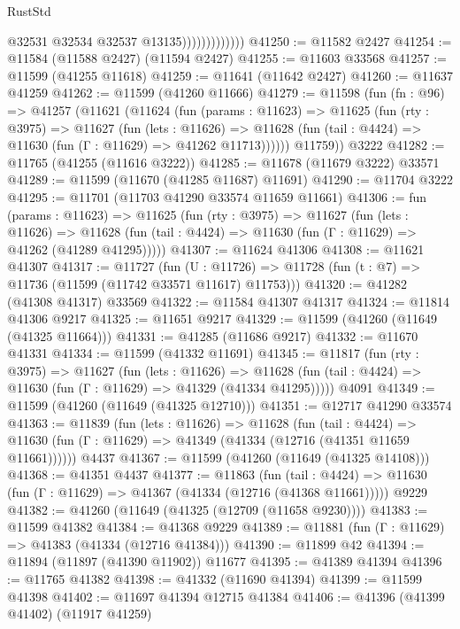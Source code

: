 \begin{lexlean}{RustStd}
\begin{coremodule}
                              @32531
                              @32534
                              @32537
                              @13135)))))))))))))
@41250 := @11582 @2427
@41254 := @11584 (@11588 @2427) (@11594 @2427)
@41255 := @11603 @33568
@41257 := @11599 (@41255 @11618)
@41259 := @11641 (@11642 @2427)
@41260 := @11637 @41259
@41262 := @11599 (@41260 @11666)
@41279 := @11598
    (fun (fn : @96) =>
    @41257
      (@11621
        (@11624
          (fun (params : @11623) =>
          @11625
            (fun (rty : @3975) =>
            @11627
              (fun (lets : @11626) =>
              @11628 (fun (tail : @4424) => @11630 (fun (Γ : @11629) => @41262 @11713))))))
        @11759))
    @3222
@41282 := @11765 (@41255 (@11616 @3222))
@41285 := @11678 (@11679 @3222) @33571
@41289 := @11599 (@11670 (@41285 @11687) @11691)
@41290 := @11704 @3222
@41295 := @11701 (@11703 @41290 @33574 @11659 @11661)
@41306 := fun (params : @11623) =>
  @11625
    (fun (rty : @3975) =>
    @11627
      (fun (lets : @11626) =>
      @11628 (fun (tail : @4424) => @11630 (fun (Γ : @11629) => @41262 (@41289 @41295)))))
@41307 := @11624 @41306
@41308 := @11621 @41307
@41317 := @11727
    (fun (U : @11726) => @11728 (fun (t : @7) => @11736 (@11599 (@11742 @33571 @11617) @11753)))
@41320 := @41282 (@41308 @41317) @33569
@41322 := @11584 @41307 @41317
@41324 := @11814 @41306 @9217
@41325 := @11651 @9217
@41329 := @11599 (@41260 (@11649 (@41325 @11664)))
@41331 := @41285 (@11686 @9217)
@41332 := @11670 @41331
@41334 := @11599 (@41332 @11691)
@41345 := @11817
    (fun (rty : @3975) =>
    @11627
      (fun (lets : @11626) =>
      @11628 (fun (tail : @4424) => @11630 (fun (Γ : @11629) => @41329 (@41334 @41295)))))
    @4091
@41349 := @11599 (@41260 (@11649 (@41325 @12710)))
@41351 := @12717 @41290 @33574
@41363 := @11839
    (fun (lets : @11626) =>
    @11628
      (fun (tail : @4424) =>
      @11630 (fun (Γ : @11629) => @41349 (@41334 (@12716 (@41351 @11659 @11661))))))
    @4437
@41367 := @11599 (@41260 (@11649 (@41325 @14108)))
@41368 := @41351 @4437
@41377 := @11863
    (fun (tail : @4424) => @11630 (fun (Γ : @11629) => @41367 (@41334 (@12716 (@41368 @11661)))))
    @9229
@41382 := @41260 (@11649 (@41325 (@12709 (@11658 @9230))))
@41383 := @11599 @41382
@41384 := @41368 @9229
@41389 := @11881 (fun (Γ : @11629) => @41383 (@41334 (@12716 @41384)))
@41390 := @11899 @42
@41394 := @11894 (@11897 (@41390 @11902)) @11677
@41395 := @41389 @41394
@41396 := @11765 @41382
@41398 := @41332 (@11690 @41394)
@41399 := @11599 @41398
@41402 := @11697 @41394 @12715 @41384
@41406 := @41396 (@41399 @41402) (@11917 @41259)

\end{coremodule}
\end{lexlean}
